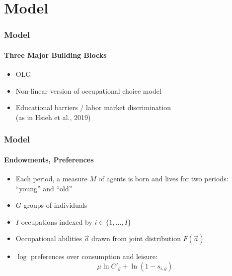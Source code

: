 \documentclass[11pt]{beamer}
\begin{document}
\section{Model}	
 \begin{frame}
		\frametitle{Model}
		\framesubtitle{Three Major Building Blocks}
		\begin{itemize}
			\item OLG
			\item Non-linear version of occupational choice model
			\item Educational barriers / labor market discrimination \\
			(as in Hsieh et al., 2019)
		\end{itemize}
	\end{frame}
	
	\begin{frame}
		\frametitle{Model}
		\framesubtitle{Endowments, Preferences}
		\begin{itemize}
			\item Each period, a measure $M$ of agents is born and lives for two periods: ``young'' and ``old''
			\item $G$ groups of individuals
            \item $I$ occupations indexed by $i \in \{1,\dots,I\}$
			\item Occupational abilities $\vec{a}$ drawn from joint distribution $F(\vec{a})$
			\item $\log$ preferences over consumption and leisure:
			\begin{displaymath}
				\mu \ln C'_{g} + \ln\left(1-s_{i,g} \right)
			\end{displaymath}
		\end{itemize}
	\end{frame}
	
\end{document}
